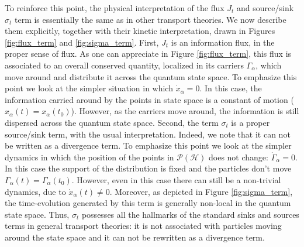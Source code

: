 \documentclass[draft,nofootinbib,pre,twocolumn,showpacs,showkeys,preprintnumbers,floatfix]{revtex4-1}
\newcommand{\1}{\mathbbm{1}}
\newcommand{\PH}{\mathcal{P}(\mathcal{H})}
\begin{document}
To reinforce this point, the physical interpretation of the flux $J_t$ and source/sink $\sigma_t$ term is essentially the 
same as in other transport theories. We now describe them explicitly, together with their kinetic interpretation, drawn
in Figures \ref{fig:flux_term} and \ref{fig:sigma_term}. First, $J_t$ is an information flux, in the proper sense of flux. As one can appreciate 
in Figure \ref{fig:flux_term}, this flux is associated to an overall conserved quantity, localized in its carriers $\Gamma_\alpha$, 
which move around and distribute it across the quantum state space. To emphasize this point we look at the simpler situation
in which $\dot{x}_\alpha = 0$. In this case, the information carried around by the points in state space is a constant
of motion ($x_\alpha(t)= x_\alpha(t_0)$). However, as the carriers move around, the information is still dispersed across
the quantum state space.
Second, the term $\sigma_t$ is a proper source/sink term, with the usual interpretation. Indeed, we note that it
can not be written as a divergence term. To emphasize this point we look at the simpler dynamics in which the 
position of the points in $\PH$ does not change: $\dot{\Gamma}_\alpha = 0$. In this case the support of the 
distribution is fixed and the particles don't move $\Gamma_\alpha(t)=\Gamma_\alpha(t_0)$. However, even in 
this case there can still be a non-trivial dynamics, due to $\dot{x}_\alpha(t)\neq 0$. Moreover, as depicted
in Figure \ref{fig:sigma_term}, the time-evolution generated by this term is generally non-local in the quantum
state space. Thus, $\sigma_t$ possesses all the hallmarks of the standard sinks and sources terms in general 
transport theories: it is not associated with particles moving around the state space and it can not be rewritten 
as a divergence term.
\end{document}

